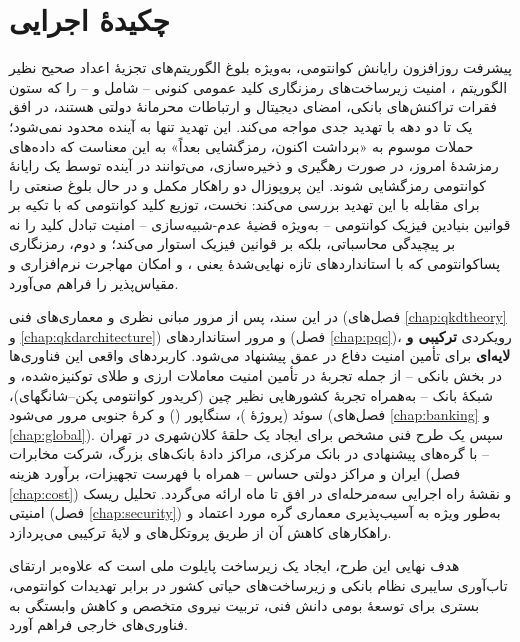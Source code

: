\chapter*{چکیدهٔ اجرایی}

پیشرفت روزافزون رایانش کوانتومی، به‌ویژه بلوغ الگوریتم‌های تجزیهٔ اعداد صحیح نظیر الگوریتم ، امنیت زیرساخت‌های رمزنگاری کلید عمومی کنونی -- شامل  و  -- را که ستون فقرات تراکنش‌های بانکی، امضای دیجیتال و ارتباطات محرمانهٔ دولتی هستند، در افق یک تا دو دهه با تهدید جدی مواجه می‌کند. این تهدید تنها به آینده محدود نمی‌شود؛ حملات موسوم به «برداشت اکنون، رمزگشایی بعداً»  به این معناست که داده‌های رمزشدهٔ امروز، در صورت رهگیری و ذخیره‌سازی، می‌توانند در آینده توسط یک رایانهٔ کوانتومی رمزگشایی شوند. این پروپوزال دو راهکار مکمل و در حال بلوغ صنعتی را برای مقابله با این تهدید بررسی می‌کند: نخست، توزیع کلید کوانتومی  که با تکیه بر قوانین بنیادین فیزیک کوانتومی -- به‌ویژه قضیهٔ عدم-شبیه‌سازی  -- امنیت تبادل کلید را نه بر پیچیدگی محاسباتی، بلکه بر قوانین فیزیک استوار می‌کند؛ و دوم، رمزنگاری پساکوانتومی  که با استانداردهای تازه نهایی‌شدهٔ  یعنی ،  و   امکان مهاجرت نرم‌افزاری و مقیاس‌پذیر را فراهم می‌آورد.

در این سند، پس از مرور مبانی نظری و معماری‌های فنی  (فصل‌های \ref{chap:qkdtheory} و \ref{chap:qkdarchitecture}) و مرور استانداردهای  (فصل \ref{chap:pqc})، رویکردی \textbf{ترکیبی و لایه‌ای}  برای تأمین امنیت دفاع در عمق پیشنهاد می‌شود. کاربردهای واقعی این فناوری‌ها در بخش بانکی -- از جمله تجربهٔ  در تأمین امنیت معاملات ارزی و طلای توکنیزه‌شده، و شبکهٔ  بانک  -- به‌همراه تجربهٔ کشورهایی نظیر چین (کریدور کوانتومی پکن--شانگهای)، سوئد (پروژهٔ )، سنگاپور () و کرهٔ جنوبی مرور می‌شود (فصل‌های \ref{chap:banking} و \ref{chap:global}). سپس یک طرح فنی مشخص برای ایجاد یک حلقهٔ کلان‌شهری  در تهران -- با گره‌های پیشنهادی در بانک مرکزی، مراکز دادهٔ بانک‌های بزرگ، شرکت مخابرات ایران و مراکز دولتی حساس -- همراه با فهرست تجهیزات، برآورد هزینه (فصل \ref{chap:cost}) و نقشهٔ راه اجرایی سه‌مرحله‌ای در افق  تا  ماه ارائه می‌گردد. تحلیل ریسک امنیتی (فصل \ref{chap:security}) به‌طور ویژه به آسیب‌پذیری معماری گره مورد اعتماد  و راهکارهای کاهش آن از طریق پروتکل‌های  و لایهٔ ترکیبی  می‌پردازد.

هدف نهایی این طرح، ایجاد یک زیرساخت پایلوت ملی است که علاوه‌بر ارتقای تاب‌آوری سایبری نظام بانکی و زیرساخت‌های حیاتی کشور در برابر تهدیدات کوانتومی، بستری برای توسعهٔ بومی دانش فنی، تربیت نیروی متخصص و کاهش وابستگی به فناوری‌های خارجی فراهم آورد.

